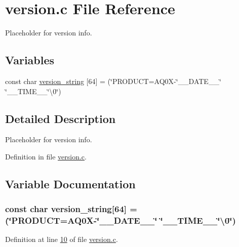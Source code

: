 \hypertarget{a00075}{\section{version.\+c File Reference}
\label{a00075}
}


Placeholder for version info.  


\subsection*{Variables}
\begin{DoxyCompactItemize}
\item 
const char \hyperlink{a00075_a9913e6dccd88bd052d3e8e9d73da4ede}{version\+\_\+string} \mbox{[}64\mbox{]} = (\char`\"{}P\+R\+O\+D\+U\+C\+T=A\+Q0\+X-\/\char`\"{}\+\_\+\+\_\+\+D\+A\+T\+E\+\_\+\+\_\+\char`\"{} \char`\"{}\+\_\+\+\_\+\+T\+I\+M\+E\+\_\+\+\_\+\char`\"{}\textbackslash{}0\char`\"{})
\end{DoxyCompactItemize}


\subsection{Detailed Description}
Placeholder for version info. 



Definition in file \hyperlink{a00075_source}{version.\+c}.



\subsection{Variable Documentation}
\hypertarget{a00075_a9913e6dccd88bd052d3e8e9d73da4ede}{
\subsubsection[{version\+\_\+string}]{\setlength{\rightskip}{0pt plus 5cm}const char version\+\_\+string\mbox{[}64\mbox{]} = (\char`\"{}P\+R\+O\+D\+U\+C\+T=A\+Q0\+X-\/\char`\"{}\+\_\+\+\_\+\+D\+A\+T\+E\+\_\+\+\_\+\char`\"{} \char`\"{}\+\_\+\+\_\+\+T\+I\+M\+E\+\_\+\+\_\+\char`\"{}\textbackslash{}0\char`\"{})}}\label{a00075_a9913e6dccd88bd052d3e8e9d73da4ede}


Definition at line \hyperlink{a00075_source_l00010}{10} of file \hyperlink{a00075_source}{version.\+c}.

